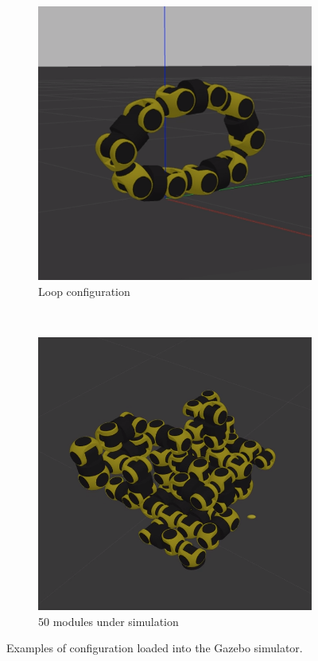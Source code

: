 \begin{figure}[!t]
    \centering
    \begin{subfigure}[b]{0.45\textwidth}
        \includegraphics[width=\textwidth]{figures/sim-roller.png}
        \caption{Loop configuration}
    \end{subfigure}
    ~
    \begin{subfigure}[b]{0.45\textwidth}
        \includegraphics[width=\textwidth]{figures/sim-large.png}
        \caption{50 modules under simulation}
    \end{subfigure}

    \caption{Examples of configuration loaded into the Gazebo simulator.}\label{fig:gazebo}
\end{figure}

